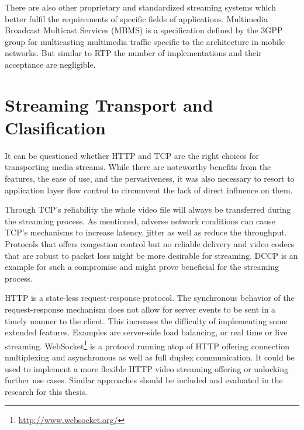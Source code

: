 There are also other proprietary and standardized streaming systems which better fulfil the requirements of specific fields of applications.  Multimedia Broadcast Multicast Services (MBMS)\cite{3gpp22.146,3gpp22.246} is a specification defined by the 3GPP group for multicasting multimedia traffic specific to the architecture in mobile networks. But similar to RTP the number of implementations and their acceptance are negligible.

\section{Streaming Transport and Clasification}


It can be questioned whether HTTP and TCP are the right choices for transporting media streams.
While there are noteworthy benefits from the features, the ease of use, and the pervasiveness, it was also necessary to resort to application layer flow control to circumvent the lack of direct influence on them.

Through TCP's reliability the whole video file will always be transferred during the streaming process. As mentioned, adverse network conditions can cause TCP's mechanisms to increase latency, jitter as well as reduce the throughput. Protocols that offers congestion control but no reliable delivery and video codecs that are robust to packet loss might be more desirable for streaming. DCCP \cite{kohler2006designing} is an example for such a compromise and might prove beneficial for the streaming process.

HTTP is a state-less request-response protocol. The synchronous behavior of the request-response mechanism does not allow for server events to be sent in a timely manner to the client. This increases the difficulty of implementing some extended features. Examples are server-side load balancing, or real time or live streaming. WebSocket\footnote{\url{http://www.websocket.org/}} \cite{ietf2011websocket} is a protocol running atop of HTTP offering connection multiplexing and asynchronous as well as full duplex communication. It could be used to implement a more flexible HTTP video streaming offering or unlocking further use cases. Similar approaches should be included and evaluated in the research for this thesis.

